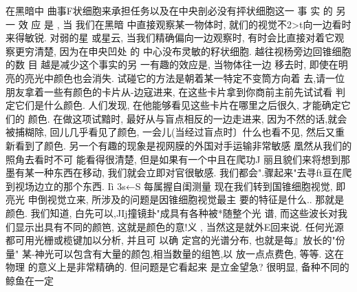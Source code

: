 \documentclass[11pt,oneside]{book}
\begin{document}
\begin{common-format}
在黑暗中 曲事F状细胞来承担任务以及在中央剖必没有抨状细胞这一 事 实 的 另 一 效 应
是 , 当 我们在黑暗 中直接观察某一物体时, 就们的视觉不2>t向一边看时来得敏锐. 对弱的星
或星云, 当我们精确偏向一边观察时, 有时会比直接对着它观察更穷清楚, 因为在申央凹处
的 中心没布灵敏的籽状细胞.
越往视杨旁边回锥细胞的数 目 越是减少这个事实的另 一有趣的效应是, 当物体往一边
移去时, 即使在明亮的亮光中颜色也会消失. 试碰它的方法是朝着某一特定不变筒方向着
去,请一位朋友拿着一些有颜色的卡片从-边寇进来, 在这些卡片拿到你商前主前先试试看
判定它们是什么颜色. 人们发现, 在他能够看见这些卡片在哪里之后很久, 才能确定它们的
颜色. 在做这项试黯时, 最好从与盲点相反的一边走进来, 因为不然的话,就会被捕糊除,
回儿几乎看见了颜色, 一会儿(当经过盲点时〕什么也看不见, 然后又重新看到了颜色.
另一个有趣的现象是视网膜的外国对手运输非常敏感 凰然从我们的照角去看时不可
能看得很清楚, 但是如果有一个中且在爬功J 丽且貌们来将想到那墨有某一种东西在移动,
我们就会立即对官很敏感. 我们都会".骤起来"去寻ft亘在爬到视场边立的那个东西.
Iì 3s←S
每属握自闺测量
现在我们转到国锥细胞视觉, 即亮光 申倒视觉立来, 所涉及的问题是因锥细胞视觉最主
要的特征是什么.. 那就是颜色.
我们知道, 白先可以,JIj撞镜卦"成具有各种被*随整个光
谱, 而这些波长对我们显示出具有不同的颜笆, 这就是颜色的意!义 , 当然这是就外E回来说.
任何光源都可用光栅或榄键加以分析, 并且可 以确 定宫的光谱分布, 也就是每』放长的"份
量" 某-神光可以包含有大量的颜包,相当数量的组笆,以 放一点点费色, 等等. 这在物理
的意义上是非常精确的. 但问题是它看起来 是立金望急? 很明显, 备种不同的鲸鱼在一定


\end{common-format}
\end{document}
